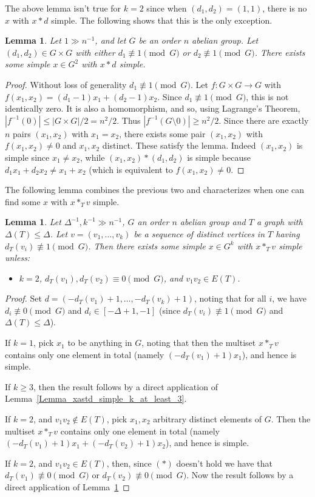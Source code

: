 \documentclass[a4paper,11pt,hidelinks]{amsart}
\newtheorem{lemma}[theorem]{Lemma}
\theoremstyle{definition}
\begin{document}
The above lemma isn't true for $k=2$ since when $(d_1, d_2)=(1,1)$, there is no $x$ with $x\ast d$ simple. The following shows that this is the only exception.
\begin{lemma}\label{Lemma_xastd_simple_k_2}
Let $1\gg n^{-1}$,  and let $G$ be an order $n$ abelian group. Let $(d_1,d_2)\in G\times G$ with either $d_{1}\not\equiv 1\pmod G$ or $d_{2}\not\equiv 1\pmod G$. There exists some simple $x\in G^2$ with  $x\ast d$ simple.
\end{lemma}
\begin{proof}
Without loss of generality $d_{1}\not\equiv 1\pmod G$.
Let $f:G\times G\to G$ with $f(x_1,x_2)=(d_1-1)x_1+(d_2-1)x_2$. Since $d_{1}\not\equiv 1\pmod G$, this is not identically zero. It is also a homomorphism, and so, using Lagrange's Theorem, $|f^{-1}(0)|\leq |G\times G|/2=n^2/2$.
Thus $|f^{-1}(G\setminus 0)|\geq n^2/2$. 
Since there are exactly $n$ pairs $(x_1, x_2)$ with $x_1=x_2$, there exists some pair $(x_1, x_2)$ with $f(x_1, x_2)\neq 0$ and $x_1, x_2$ distinct. These satisfy the lemma. Indeed $(x_1, x_2)$ is simple since $x_1\neq x_2$, while $(x_1, x_2)\ast (d_1, d_2)$ is simple because $d_1x_1+d_2x_2\neq x_1+x_2$ (which is equivalent to $f(x_1, x_2)\neq 0$.
\end{proof}
The following lemma combines the previous two and characterizes when one can find some $x$ with $x\ast_T v$ simple.
\begin{lemma}\label{Lemma_kastv_simple_tree}
Let $\Delta^{-1}, k^{-1}\gg n^{-1}$, $G$ an order $n$ abelian group and $T$ a graph with $\Delta(T)\leq \Delta$. Let $v=(v_1, \dots, v_k)$ be a sequence of distinct vertices in $T$ having $d_T(v_i)\not\equiv 1 \pmod G$. Then there exists some simple $x\in G^{k}$ with $x \ast_T v$ simple unless:
\begin{itemize}
\item[$(\ast)$] $k=2$, $d_T(v_1), d_T(v_2)\equiv 0 \pmod G$, and $v_1v_2\in E(T)$.
\end{itemize}
\end{lemma}
\begin{proof}
Set $d=(-d_T(v_1)+1, \dots, -d_T(v_k)+1)$, noting that for all $i$, we have $d_i\not \equiv 0 \pmod G$ and $d_i\in [-\Delta+1, -1]$ (since $d_T(v_i)\not\equiv 1 \pmod G$ and $\Delta(T)\leq \Delta$).

If $k=1$, pick $x_1$ to be anything in $G$, noting that then the multiset $x \ast_T v$ contains only one element in total (namely $(-d_T(v_1)+1)x_1$), and hence is simple.

If $k\geq 3$, then the result follows by a direct application of Lemma~\ref{Lemma_xastd_simple_k_at_least_3}. 

If $k=2$, and $v_1v_2\not\in E(T)$, pick $x_1, x_2$ arbitrary distinct elements of $G$. Then the multiset $x \ast_T v$ contains only one element in total (namely $(-d_T(v_1)+1)x_1+(-d_T(v_2)+1)x_2$), and hence is simple.

If $k=2$, and $v_1v_2\in E(T)$, then, since $(\ast)$ doesn't hold we have that  $d_T(v_1)\not\equiv 0 \pmod G$ or $d_T(v_2)\not\equiv 0 \pmod G$. Now the result follows by a direct application of Lemma~\ref{Lemma_xastd_simple_k_2}
\end{proof}
\end{document}
